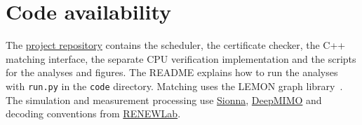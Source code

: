 \documentclass[11pt,letterpaper]{article}
\begin{document}
\section*{Code availability}
The \href{https://github.com/pooya-hejazi/uplink-scheduling}{project repository} contains the scheduler, the certificate checker, the C++ matching interface, the separate CPU verification implementation and the scripts for the analyses and figures. The README explains how to run the analyses with \texttt{run.py} in the \texttt{code} directory. Matching uses the LEMON graph library~\cite{lemon}. The simulation and measurement processing use \href{https://github.com/NVlabs/sionna}{Sionna}, \href{https://github.com/DeepMIMO/DeepMIMO}{DeepMIMO} and decoding conventions from \href{https://github.com/renew-wireless/RENEWLab}{RENEWLab}.
\end{document}
